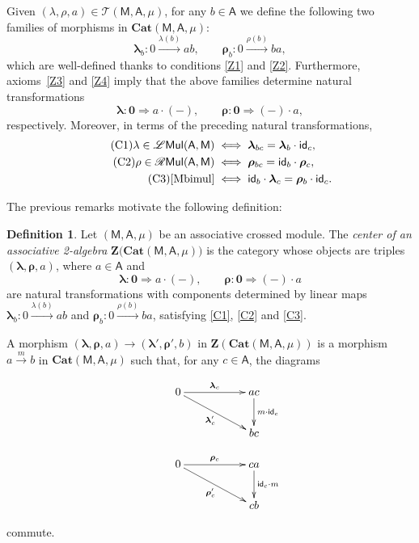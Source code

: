 \documentclass[12pt,reqno]{amsart}
\theoremstyle{plain}
\theoremstyle{definition}
\newtheorem{definition}[theorem]{Definition}
\theoremstyle{remark}
\newcommand{\A}{\ensuremath{\mathsf{A}}}
\newcommand{\id}{\ensuremath{\mathsf{id}}}
\newcommand{\MM}{\ensuremath{\mathsf{M}}}
\newcommand{\ZC}{\ensuremath{\mathbf{Z}}}
\newcommand{\T}{\ensuremath{\mathcal{T}}}
\newcommand{\Cat}{\ensuremath{\mathbf{Cat}}}
\DeclareMathOperator{\LM}{\mathcal{L}\mathsf{Mul}}
\DeclareMathOperator{\RM}{\mathcal{R}\mathsf{Mul}}
\numberwithin{equation}{section}
\begin{document}
Given $(\lambda,\rho,a)\in \T(\MM,\A,\mu)$, for any $b\in \A$ we define the following two families of morphisms in $\Cat(\MM,\A,\mu)$:
\[\boldsymbol{\lambda}_{b}\colon 0\xrightarrow{\lambda(b)}ab,\qquad \boldsymbol{\rho}_{b}\colon 0\xrightarrow{\rho(b)}ba,\]
which are well-defined thanks to conditions \eqref{Z1} and \eqref{Z2}. Furthermore, axioms~\eqref{Z3} and \eqref{Z4} imply that the above families determine natural transformations 
\[\boldsymbol{\lambda} \colon \mathbf{0} \Longrightarrow a\cdot(-),\qquad \boldsymbol{\rho} \colon\mathbf{0} \Longrightarrow (-)\cdot a,\]
respectively. Moreover, in terms of the preceding natural transformations, 
\begin{align}\label{C1}\tag{C1}
	\lambda\in\LM(\A,\MM)&\iff \boldsymbol{\lambda}_{bc}=\boldsymbol{\lambda}_{b}\cdot \id_{c},\\
	\label{C2}\tag{C2}\rho\in\RM(\A,\MM)&\iff \boldsymbol{\rho}_{bc}= \id_{b}\cdot \boldsymbol{\rho}_{c},\\
	\label{C3}\tag{C3}\eqref{Mbimul}&\iff \id_{b}\cdot \boldsymbol{\lambda}_{c}=\boldsymbol{\rho}_{b}\cdot \id_{c}.
\end{align}

The previous remarks motivate the following definition:
\begin{definition}
	Let $(\MM,\A,\mu)$ be an associative crossed module. The \emph{center of an associative 2-algebra} $\ZC\big(\Cat(\MM,\A,\mu)\big)$ 
	is the category whose objects are triples $(\boldsymbol{\lambda} ,\boldsymbol{\rho},a)$, where $a\in\A$ and
	\[\boldsymbol{\lambda}  \colon \mathbf{0} \Longrightarrow a\cdot(-),\qquad \boldsymbol{\rho} \colon\mathbf{0} \Longrightarrow (-)\cdot a\]
	are natural transformations with components determined by linear maps $\boldsymbol{\lambda} _{b}\colon 0\xrightarrow{\lambda(b)}ab$ and $\boldsymbol{\rho}_{b}\colon 0\xrightarrow{\rho(b)}ba$,
	 satisfying \eqref{C1}, \eqref{C2} and \eqref{C3}.
	
	A morphism $(\boldsymbol{\lambda} ,\boldsymbol{\rho},a)\rightarrow (\boldsymbol{\lambda} ',\boldsymbol{\rho}',b)$ in $\ZC(\Cat(\MM,\A,\mu))$ is a morphism
	 $a\xrightarrow{m}b$ in $\Cat(\MM,\A,\mu)$ such that, for any $c\in\A$, the diagrams
	
	\noindent\begin{minipage}{0.48\linewidth}
		\[\xymatrix{&0\ar[rr]^-{\boldsymbol{\lambda} _{c}}\ar[rrd]_-{\boldsymbol{\lambda} '_{c}} & &ac\ar[d]^-{m\cdot \id_{c}}\\& & &bc}\]
	\end{minipage}\hfill
	\begin{minipage}{0.48\linewidth}
		\begin{equation}\label{morcat}
			\begin{aligned}
				\xymatrix{&0\ar[rr]^-{\boldsymbol{\rho}_{c}}\ar[rrd]_-{\boldsymbol{\rho}'_{c}} & &ca\ar[d]^-{\id_{c}\cdot m}\\& & &cb}
			\end{aligned}
		\end{equation}
	\end{minipage}
	commute.
\end{definition}
 
\end{document}
